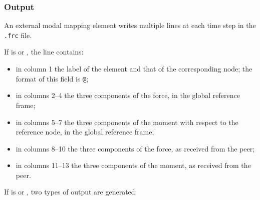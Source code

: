 \subsubsection{Output}
An external modal mapping element writes multiple lines at each time step
in the \texttt{.frc} file.

If  is  or , the line contains:
\begin{itemize}
\item in column 1 the label of the element and that of the corresponding node;
	the format of this field is \texttt{@};
\item in columns 2--4 the three components of the force,
	in the global reference frame;
\item in columns 5--7 the three components of the moment
	with respect to the reference node,
	in the global reference frame;
\item in columns 8--10 the three components of the force,
	as received from the peer;
\item in columns 11--13 the three components of the moment,
	as received from the peer.
\end{itemize}
If  is  or , two types of output are generated:
